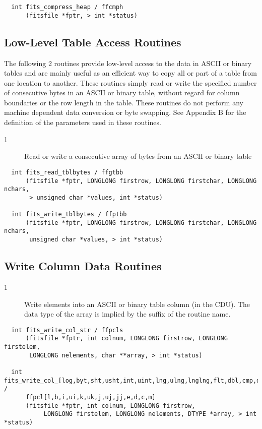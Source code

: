\documentclass[11pt]{book}
\begin{document}
\begin{verbatim}
  int fits_compress_heap / ffcmph
      (fitsfile *fptr, > int *status)
\end{verbatim}


\subsection{Low-Level Table Access Routines}

The following 2 routines provide low-level access to the data in ASCII
or binary tables and are mainly useful as an efficient way to copy all
or part of a table from one location to another.  These routines simply
read or write the specified number of consecutive bytes in an ASCII or
binary table, without regard for column boundaries or the row length in
the table.  These routines do not perform any machine dependent data
conversion or byte swapping.  See Appendix B for the definition of the
parameters used in these routines.


\begin{description}
\item[1 ] Read or write a consecutive array of bytes from an ASCII or binary
   table \label{ffgtbb}  \label{ffptbb}
\end{description}

\begin{verbatim}
  int fits_read_tblbytes / ffgtbb
      (fitsfile *fptr, LONGLONG firstrow, LONGLONG firstchar, LONGLONG nchars,
       > unsigned char *values, int *status)

  int fits_write_tblbytes / ffptbb
      (fitsfile *fptr, LONGLONG firstrow, LONGLONG firstchar, LONGLONG nchars,
       unsigned char *values, > int *status)
\end{verbatim}


\subsection{Write Column Data Routines}


\begin{description}
\item[1 ] Write elements into an ASCII or binary table column (in the CDU).
    The data type of the array is implied by the suffix of the
   routine name. \label{ffpcls}
\end{description}

\begin{verbatim}
  int fits_write_col_str / ffpcls
      (fitsfile *fptr, int colnum, LONGLONG firstrow, LONGLONG firstelem,
       LONGLONG nelements, char **array, > int *status)

  int fits_write_col_[log,byt,sht,usht,int,uint,lng,ulng,lnglng,flt,dbl,cmp,dblcmp] /
      ffpcl[l,b,i,ui,k,uk,j,uj,jj,e,d,c,m]
      (fitsfile *fptr, int colnum, LONGLONG firstrow,
           LONGLONG firstelem, LONGLONG nelements, DTYPE *array, > int *status)
\end{verbatim}
\end{document}

